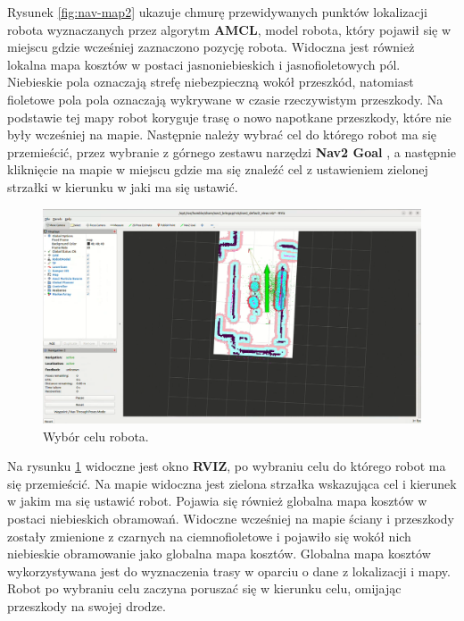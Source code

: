 \documentclass[a4paper,twoside,12pt]{book}
\begin{document}
Rysunek \ref{fig:nav-map2} ukazuje chmurę przewidywanych punktów lokalizacji robota wyznaczanych przez algorytm \textbf{AMCL}, model robota, który pojawił się w miejscu gdzie wcześniej zaznaczono pozycję robota. Widoczna jest również lokalna mapa kosztów w postaci jasnoniebieskich i jasnofioletowych pól. Niebieskie pola oznaczają strefę niebezpieczną wokół przeszkód, natomiast fioletowe pola pola oznaczają wykrywane w czasie rzeczywistym przeszkody. Na podstawie tej mapy robot koryguje trasę o nowo napotkane przeszkody, które nie były wcześniej na mapie.
\newpage
Następnie należy wybrać cel do którego robot ma się przemieścić, przez wybranie z górnego zestawu narzędzi \textbf{Nav2 Goal} , a następnie kliknięcie na mapie w miejscu gdzie ma się znaleźć cel z ustawieniem zielonej strzałki w kierunku w jaki ma się ustawić.
\begin{figure}[!hb]
	\centering
	\includegraphics[width=1\textwidth]{images/launch-nav3.png}
	\caption{Wybór celu robota.}
	\label{fig:nav-map3}
\end{figure}
Na rysunku \ref{fig:nav-map3} widoczne jest okno \textbf{RVIZ}, po wybraniu celu do którego robot ma się przemieścić. Na mapie widoczna jest zielona strzałka wskazująca cel i kierunek w jakim ma się ustawić robot. Pojawia się również globalna mapa kosztów w postaci niebieskich obramowań. Widoczne wcześniej na mapie ściany i przeszkody zostały zmienione z czarnych na ciemnofioletowe i pojawiło się wokół nich niebieskie obramowanie jako globalna mapa kosztów. Globalna mapa kosztów wykorzystywana jest do wyznaczenia trasy w oparciu o dane z lokalizacji i mapy.
\newpage
Robot po wybraniu celu zaczyna poruszać się w kierunku celu, omijając przeszkody na swojej drodze.
\end{document}
